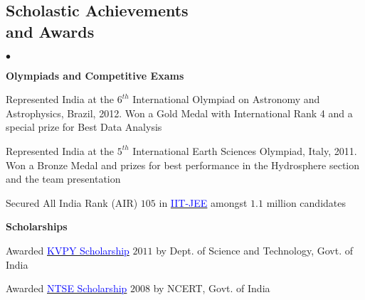 \documentclass[margin,line]{res}
\newenvironment{list2}{
  \begin{list}{$\bullet$}{%
      \setlength{\itemsep}{0in}
      \setlength{\parsep}{0in} \setlength{\parskip}{0in}
      \setlength{\topsep}{0in} \setlength{\partopsep}{0in} 
      \setlength{\leftmargin}{0.2in}}}{\end{list}}
\begin{document}
\begin{resume}
\section{\sc Scholastic Achievements \\and Awards}
\begin{list2}
\item[\strut\hspace{0.5cm}\textbf{Olympiads and Competitive Exams}]
\item Represented India at the $6^{th}$ International Olympiad on Astronomy and Astrophysics, Brazil, 2012. Won a Gold Medal with International Rank 4 and a special prize for Best Data Analysis
\item Represented India at the $5^{th}$ International Earth Sciences Olympiad, Italy, 2011. Won a Bronze Medal and prizes for best performance in the Hydrosphere section and the team presentation
\item  Secured All India Rank (AIR) $105$ in \href{https://en.wikipedia.org/wiki/Indian_Institute_of_Technology_Joint_Entrance_Examination}{\textcolor{blue}{IIT-JEE}} amongst $1.1$ million candidates
\vspace{0.05in}
\item[\strut\hspace{0.5cm}\textbf{Scholarships}]
\item Awarded \href{http://www.kvpy.iisc.ernet.in/main/index.htm}{\textcolor{blue}{KVPY Scholarship}} $2011$ by Dept. of Science and Technology, Govt. of India
\item Awarded \href{http://www.ncert.nic.in/programmes/talent_exam/index_talent.html}{\textcolor{blue}{NTSE Scholarship}} $2008$ by NCERT, Govt. of India
\end{list2}



\end{resume}
\end{document}
